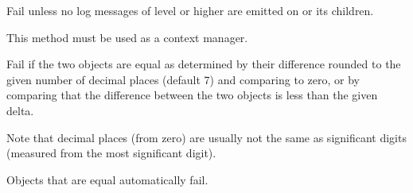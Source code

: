 \documentclass[letterpaper,10pt,english]{sphinxmanual}
\begin{document}
\begin{fulllineitems}
\begin{fulllineitems}
\end{fulllineitems}


\begin{fulllineitems}
\label{\detokenize{_autosummary/tests.test_unit.test_df:tests.test_unit.test_df.assertNoLogs}}
\pysigstartsignatures
{}
\pysigstopsignatures
\sphinxAtStartPar
Fail unless no log messages of level  or higher are emitted
on  or its children.

\sphinxAtStartPar
This method must be used as a context manager.

\end{fulllineitems}


\begin{fulllineitems}
\label{\detokenize{_autosummary/tests.test_unit.test_df:tests.test_unit.test_df.assertNotAlmostEqual}}
\pysigstartsignatures
{}
\pysigstopsignatures
\sphinxAtStartPar
Fail if the two objects are equal as determined by their
difference rounded to the given number of decimal places
(default 7) and comparing to zero, or by comparing that the
difference between the two objects is less than the given delta.

\sphinxAtStartPar
Note that decimal places (from zero) are usually not the same
as significant digits (measured from the most significant digit).

\sphinxAtStartPar
Objects that are equal automatically fail.

\end{fulllineitems}



\end{fulllineitems}
\end{document}
